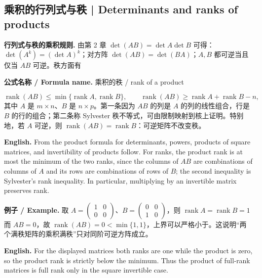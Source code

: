 \documentclass[UTF8,11pt,a4paper]{ctexart}
\newcommand{\EN}[1]{\par\noindent\textbf{English.} #1\par}
\newcommand{\FORMULA}[2]{\par\noindent\textbf{公式名称 / Formula name.} #1 / #2\par}
\newcommand{\EX}[2]{\par\noindent\textbf{例子 / Example.} #1\par\EN{#2}}
\begin{document}
\subsection{乘积的行列式与秩 | Determinants and ranks of products}
\noindent\textbf{行列式与秩的乘积规则.} 由第 2 章 $\det(AB)=\det A\det B$ 可得：$\det(A^k)=(\det A)^k$；对方阵 $\det(AB)=\det(BA)$；$A,B$ 都可逆当且仅当 $AB$ 可逆。秩方面有
\FORMULA{乘积的秩}{rank of a product}
\[
\operatorname{rank}(AB)\le\min\{\operatorname{rank}A,\operatorname{rank}B\},\qquad
\operatorname{rank}(AB)\ge \operatorname{rank}A+\operatorname{rank}B-n,
\]
其中 $A$ 是 $m\times n$、$B$ 是 $n\times p$。第一条因为 $AB$ 的列是 $A$ 的列的线性组合，行是 $B$ 的行的组合；第二条称 Sylvester 秩不等式，可由限制映射到核上证明。特别地，若 $A$ 可逆，则 $\operatorname{rank}(AB)=\operatorname{rank}B$：可逆矩阵不改变秩。
\EN{From the product formula for determinants, powers, products of square matrices, and invertibility of products follow. For ranks, the product rank is at most the minimum of the two ranks, since the columns of $AB$ are combinations of columns of $A$ and its rows are combinations of rows of $B$; the second inequality is Sylvester's rank inequality. In particular, multiplying by an invertible matrix preserves rank.}
\EX{取 $A=\begin{pmatrix}1&0\\0&0\end{pmatrix}$、$B=\begin{pmatrix}0&0\\1&0\end{pmatrix}$，则 $\operatorname{rank}A=\operatorname{rank}B=1$ 而 $AB=0$，故 $\operatorname{rank}(AB)=0<\min\{1,1\}$，上界可以严格小于。这说明“两个满秩矩阵的乘积满秩”只对同阶可逆方阵成立。}{For the displayed matrices both ranks are one while the product is zero, so the product rank is strictly below the minimum. Thus the product of full-rank matrices is full rank only in the square invertible case.}
\end{document}
